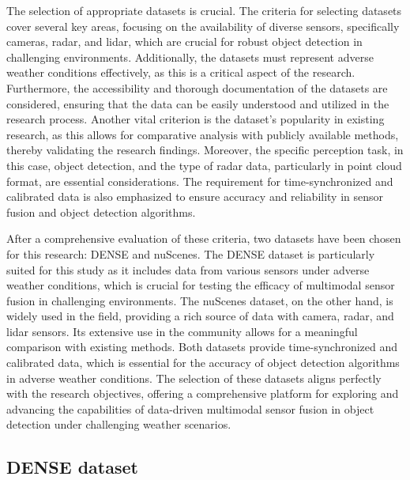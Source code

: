 \documentclass[report.tex]{subfiles}
\begin{document}

    The selection of appropriate datasets is crucial. The criteria for selecting datasets cover several key areas, focusing on the availability of diverse sensors, specifically cameras, radar, and lidar, which are crucial for robust object detection in challenging environments. Additionally, the datasets must represent adverse weather conditions effectively, as this is a critical aspect of the research. Furthermore, the accessibility and thorough documentation of the datasets are considered, ensuring that the data can be easily understood and utilized in the research process. Another vital criterion is the dataset's popularity in existing research, as this allows for comparative analysis with publicly available methods, thereby validating the research findings. Moreover, the specific perception task, in this case, object detection, and the type of radar data, particularly in point cloud format, are essential considerations. The requirement for time-synchronized and calibrated data is also emphasized to ensure accuracy and reliability in sensor fusion and object detection algorithms.

    After a comprehensive evaluation of these criteria, two datasets have been chosen for this research: DENSE and nuScenes. The DENSE dataset is particularly suited for this study as it includes data from various sensors under adverse weather conditions, which is crucial for testing the efficacy of multimodal sensor fusion in challenging environments. The nuScenes dataset, on the other hand, is widely used in the field, providing a rich source of data with camera, radar, and lidar sensors. Its extensive use in the community allows for a meaningful comparison with existing methods. Both datasets provide time-synchronized and calibrated data, which is essential for the accuracy of object detection algorithms in adverse weather conditions. The selection of these datasets aligns perfectly with the research objectives, offering a comprehensive platform for exploring and advancing the capabilities of data-driven multimodal sensor fusion in object detection under challenging weather scenarios.

    \subsection{DENSE dataset}
\end{document}
